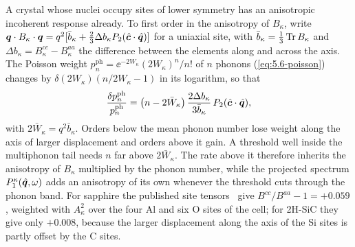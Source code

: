 A crystal whose nuclei occupy sites of lower symmetry has an anisotropic incoherent response already. To first order in the anisotropy of $B_\kappa$, write $\bm{q}\cdot B_\kappa\cdot\bm{q} = q^2[\bar b_\kappa + \tfrac23\Delta b_\kappa P_2(\hat{\bm{c}}\cdot\hat{\bm{q}})]$ for a uniaxial site, with $\bar b_\kappa = \tfrac13\operatorname{Tr} B_\kappa$ and $\Delta b_\kappa = B^{cc}_\kappa - B^{aa}_\kappa$ the difference between the elements along and across the axis. The Poisson weight $p^{\mathrm{ph}}_n = \ee^{-2W_\kappa}(2W_\kappa)^n/n!$ of $n$ phonons (\cref{eq:5.6-poisson}) changes by $\delta(2W_\kappa)(n/2W_\kappa - 1)$ in its logarithm, so that
\begin{equation}
  \frac{\delta p^{\mathrm{ph}}_n}{p^{\mathrm{ph}}_n} = \bigl(n - 2\bar W_\kappa\bigr)\,\frac{2\Delta b_\kappa}{3\bar b_\kappa}\,P_2(\hat{\bm{c}}\cdot\hat{\bm{q}}) ,
  \label{eq:11.7-dw}
\end{equation}
with $2\bar W_\kappa = q^2\bar b_\kappa$. Orders below the mean phonon number lose weight along the axis of larger displacement and orders above it gain. A threshold well inside the multiphonon tail needs $n$ far above $2\bar W_\kappa$. The rate above it therefore inherits the anisotropy of $B_\kappa$ multiplied by the phonon number, while the projected spectrum $P^\kappa_1(\hat{\bm{q}},\omega)$ adds an anisotropy of its own whenever the threshold cuts through the phonon band. For sapphire the published site tensors~\cite{stratman2025daily} give $B^{cc}/B^{aa} - 1 = +0.059$, weighted with $A_\kappa^2$ over the four Al and six O sites of the cell; for 2H-SiC they give only $+0.008$, because the larger displacement along the axis of the Si sites is partly offset by the C sites.

